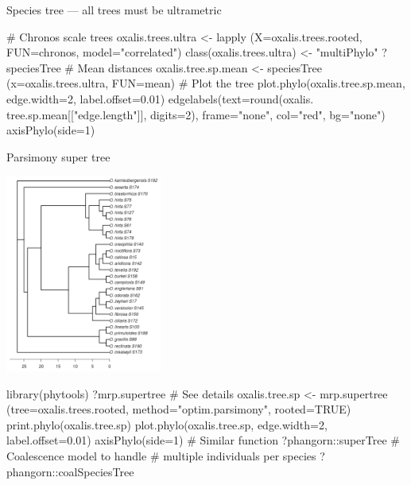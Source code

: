\documentclass[compress, xelatex, 11pt, xcolor=svgnames, aspectratio=169,
	hyperref={
		bookmarks=true,
		unicode=true,
		colorlinks=true,
		pdftitle={Molecular data in R},
		plainpages=false,
		pdfauthor={Vojtech Zeisek},
		pdfsubject={Course about phylogeny and evolution in R},
		pdfcreator={XeLaTeX},
		pdfkeywords={R, evolution, phylogeny, molecular data},
		linkcolor=Crimson, %
		anchorcolor=Magenta, %
		citecolor=Magenta, %
		filecolor=Magenta, %
		menucolor=Magenta, %
		urlcolor=DodgerBlue, %
		},
	url={hyphens, lowtilde} %
	]{beamer}
\renewcommand{\texttt}[1]{\colorbox{Beige}{{\ttfamily #1}}}
\begin{document}
\begin{frame}[fragile]{Species tree --- all trees must be ultrametric}
	\begin{multicols}{2}
		\begin{center}
			\texttt{[image: oxalis-sp.png]}
		\end{center}
		\begin{spluscode}
    # Chronos scale trees
    oxalis.trees.ultra <- lapply
      (X=oxalis.trees.rooted,
      FUN=chronos, model="correlated")
    class(oxalis.trees.ultra) <-
      "multiPhylo"
    ?speciesTree # Mean distances
    oxalis.tree.sp.mean <- speciesTree
      (x=oxalis.trees.ultra, FUN=mean)
    # Plot the tree
    plot.phylo(oxalis.tree.sp.mean,
      edge.width=2, label.offset=0.01)
    edgelabels(text=round(oxalis.
      tree.sp.mean[["edge.length"]],
      digits=2), frame="none",
      col="red", bg="none")
    axisPhylo(side=1)
		\end{spluscode}
	\end{multicols}
	\end{frame}

\begin{frame}[fragile]{Parsimony super tree}
	\begin{multicols}{2}
		\begin{center}
			\includegraphics[height=6.5cm]{oxalis-pars.png}
		\end{center}
		\begin{spluscode}
    library(phytools)
    ?mrp.supertree # See details
    oxalis.tree.sp <- mrp.supertree
      (tree=oxalis.trees.rooted,
      method="optim.parsimony",
      rooted=TRUE)
    print.phylo(oxalis.tree.sp)
    plot.phylo(oxalis.tree.sp,
      edge.width=2, label.offset=0.01)
    axisPhylo(side=1)
    # Similar function
    ?phangorn::superTree
    # Coalescence model to handle
    # multiple individuals per species
    ?phangorn::coalSpeciesTree
		\end{spluscode}
	\end{multicols}
\end{frame}
\end{document}
